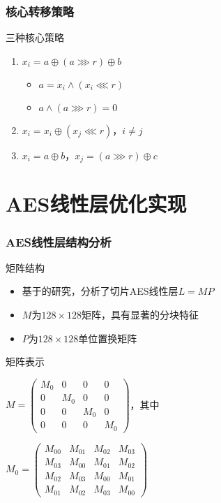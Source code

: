 \documentclass{beamer}
\begin{document}
\begin{frame}
    \frametitle{核心转移策略}
    \begin{block}{三种核心策略}
        \begin{enumerate}
            \item $x_i = a \oplus (a \ggg r) \oplus b$
            \begin{itemize}
                \item $a = x_i \land (x_i \lll r)$
                \item $a \land (a \ggg r) = 0$
            \end{itemize}
            \item $x_{i} = x_{i} \oplus (x_{j} \lll r)$，$i \neq j$
            \item $x_i = a \oplus b$，$x_j = (a \ggg r) \oplus c$
        \end{enumerate}
    \end{block}
\end{frame}

\section{AES线性层优化实现}
\begin{frame}
    \frametitle{AES线性层结构分析}
    \begin{block}{矩阵结构}
        \begin{itemize}
            \item 基于\cite{Adomnicai2021}的研究，分析了切片AES线性层$L=MP$
            \item $M$为$128 \times 128$矩阵，具有显著的分块特征
            \item $P$为$128 \times 128$单位置换矩阵
        \end{itemize}
    \end{block}
    \begin{exampleblock}{矩阵表示}
        \small{
        $M = \begin{pmatrix}
            M_0 & 0 & 0 & 0 \\
            0 & M_0 & 0 & 0 \\
            0 & 0 & M_0 & 0 \\
            0 & 0 & 0 & M_0
        \end{pmatrix}$，其中

        $M_0 = \begin{pmatrix}
            M_{00} & M_{01} & M_{02} & M_{03} \\
            M_{03} & M_{00} & M_{01} & M_{02} \\
            M_{02} & M_{03} & M_{00} & M_{01} \\
            M_{01} & M_{02} & M_{03} & M_{00}
        \end{pmatrix}$
        }
    \end{exampleblock}
\end{frame}
\end{document}
